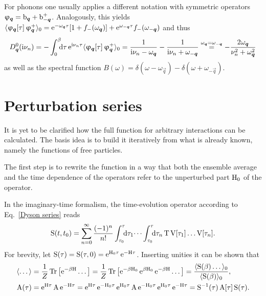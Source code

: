 For phonons one usually applies a different notation with symmetric operators
$\upvarphi_{\boldsymbol q} = \mathrm b_{\boldsymbol q} + \mathrm b_{-\boldsymbol q}^+$. Analogously, this yields
$\langle\upvarphi_{\boldsymbol q}[\tau] \, \upvarphi_{\boldsymbol q}^+\rangle_0 = \mathrm e^{-\omega_{\boldsymbol q} \tau}
[1 + f_-(\omega_{\boldsymbol q})] + \mathrm e^{\omega_{-\boldsymbol q} \tau} f_-(\omega_{-\boldsymbol q})$
and thus
%
\begin{equation} \label{D_0(i omega_n)}
    D_{\vec q}^0(\I \nu_n)
    = -\int \from 0 \till \beta \D \tau \, \E^{\I \nu_n \tau}
    \av{\upphi_{\vec q}[\tau] \, \upphi_{\vec q}^+}_0
    = \frac 1 {\I \nu_n - \omega_{\vec q}}
    - \frac 1 {\I \nu_n + \omega_{-\vec q}}
    \overset{\omega_{\vec q} = \omega_{-\vec q}} =
    -\frac{2 \omega_{\vec q}}{\nu_n^2 + \omega_{\vec q}^2}
\end{equation}
%
as well as the spectral function $B(\omega) = \delta(\omega - \omega_{\vec q}) -
\delta(\omega + \omega_{-\vec q})$.

\section{Perturbation series}

It is yet to be clarified how the full  function for arbitrary
interactions can be calculated. The basis idea is to build it iteratively from
what is already known, namely the  functions of free particles.

The first step is to rewrite the  function in a way that both the
ensemble average and the time dependence of the operators refer to the
unperturbed part $\mathrm H_0$ of the  operator.

In the imaginary-time formalism, the time-evolution operator according to
Eq.~\ref{Dyson series} reads
%
\begin{equation} \label{Matsubara-Dyson series}
    \op S(t, t_0) = \sum_{n = 0}^\infty \frac{(-1)^n}{n!}
    \int \from{\tau_0} \till \tau \D \tau_1 \dots
    \int \from{\tau_0} \till \tau \D \tau_n \,
    \op T \, \op V[\tau_1] \dots \op V[\tau_n].
\end{equation}
%
For brevity, let $\mathrm S(\tau) = \mathrm S(\tau, 0) = \mathrm e^{\mathrm H_0 \tau} \, \mathrm e^{-\mathrm H
\tau}$. Inserting unities it can be shown that
%
\begin{align*}
    \langle\dots\rangle &= \frac 1 Z \operatorname{Tr} \big[ \mathrm e^{-\beta \mathrm H} \dots \big]
    = \frac 1 Z \operatorname{Tr} \big[
        \mathrm e^{-\beta \mathrm H_0} \, \mathrm e^{\beta \mathrm H_0} \, \mathrm e^{-\beta \mathrm H} \dots
    \big]
    = \frac{\langle\mathrm S(\beta) \dots\rangle_0}{\langle\mathrm S(\beta)\rangle_0},
    \\
    \mathrm A(\tau) &= \mathrm e^{\mathrm H \tau} \, \mathrm A \, \mathrm e^{-\mathrm H \tau}
    = \mathrm e^{\mathrm H \tau} \, \mathrm e^{-\mathrm H_0 \tau} \,
    \mathrm e^{\mathrm H_0 \tau} \, \mathrm A \, \mathrm e^{-\mathrm H_0 \tau} \,
    \mathrm e^{\mathrm H_0 \tau} \, \mathrm e^{-\mathrm H \tau}
    = \mathrm S^{-1}(\tau) \, \mathrm A[\tau] \, \mathrm S(\tau).
\end{align*}

